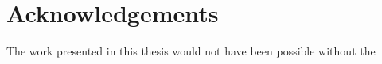 \chapter*{Acknowledgements}

The work presented in this thesis would not have been possible without the